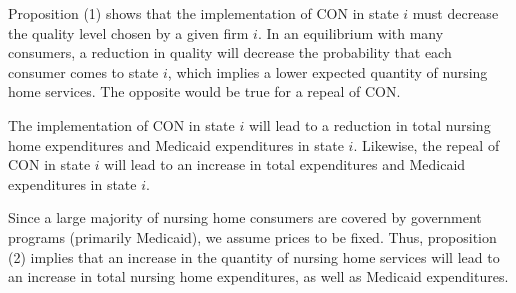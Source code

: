 \documentclass[../Main.tex]{subfiles}
\begin{document}
Proposition (1) shows that the implementation of CON in state $i$ must decrease the quality level chosen by a given firm $i$. In an equilibrium with many consumers, a reduction in quality will decrease the probability that each consumer comes to state $i$, which implies a lower expected quantity of nursing home services. The opposite would be true for a repeal of CON. 

\begin{Proposition}
The implementation of CON in state $i$ will lead to a reduction in total nursing home expenditures and Medicaid expenditures in state $i$. Likewise, the repeal of CON in state $i$ will lead to an increase in total expenditures and Medicaid expenditures in state $i$.  
\end{Proposition}

Since a large majority of nursing home consumers are covered by government programs (primarily Medicaid), we assume prices to be fixed. Thus, proposition (2) implies that an increase in the quantity of nursing home services will lead to an increase in total nursing home expenditures, as well as Medicaid expenditures.
\end{document}
